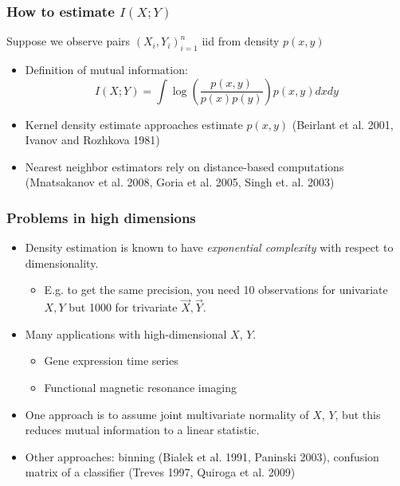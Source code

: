 \documentclass{beamer}
\begin{document}
\begin{frame}
\frametitle{How to estimate $I(X; Y)$}
Suppose we observe pairs $(X_i,Y_i)_{i=1}^n$ iid from density $p(x, y)$
\begin{itemize}
\item Definition of mutual information:
\[
I(X; Y) = \int \log \left(\frac{p(x, y)}{p(x)p(y)}\right) p(x, y) dx dy
\]\pause
\item Kernel density estimate approaches estimate $p(x,y)$ (Beirlant et al. 2001, Ivanov and Rozhkova 1981)
\item Nearest neighbor estimators rely on distance-based computations (Mnatsakanov et al. 2008, Goria et al. 2005, Singh et. al. 2003)
\end{itemize}
\end{frame}

\begin{frame}
\frametitle{Problems in high dimensions}
\begin{itemize}
\item Density estimation is known to have \emph{exponential complexity} with respect to dimensionality.
\begin{itemize}
\item E.g. to get the same precision, you need 10 observations for univariate $X, Y$ but 1000 for trivariate $\vec{X}, \vec{Y}$. \pause
\end{itemize}
\item Many applications with high-dimensional $X$, $Y$.
\begin{itemize}
\item Gene expression time series
\item Functional magnetic resonance imaging \pause
\end{itemize}
\item One approach is to assume joint multivariate normality of $X$, $Y$, but this reduces mutual information to a linear statistic. \pause
\item Other approaches: binning (Bialek et al. 1991, Paninski 2003), confusion matrix of a classifier (Treves 1997, Quiroga et al. 2009)
\end{itemize}
\end{frame}
\end{document}
